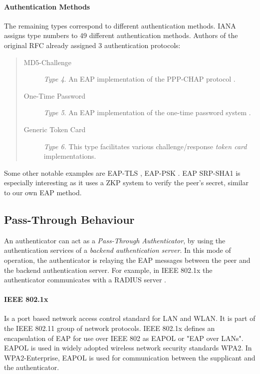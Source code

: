 \paragraph{Authentication Methods}
The remaining types correspond to different authentication methods.
IANA \cite{joseph2004eap} assigns type numbers to 49 different authentication methods.
Authors of the original RFC \cite{aboba2004extensible} already assigned 3 authentication protocols:

\begin{quote}
\begin{description}
	\item[MD5-Challenge] \textit{Type 4}. An EAP implementation of the PPP-CHAP protocol \cite{simon2008eap}.
	\item[One-Time Password] \textit{Type 5}. An EAP implementation of the one-time password system \cite{haller1998one}.
	\item[Generic Token Card] \textit{Type 6.} This type facilitates various challenge/response \textit{token card} implementations.
\end{description}
\end{quote}

Some other notable examples are EAP-TLS \cite{simon2008eap}, EAP-PSK \cite{bersani2007eap}.
EAP SRP-SHA1 \cite{ietf-pppext-eap-srp-03} is especially interesting as it uses a ZKP system to verify the peer's secret, similar to our own EAP method.

\subsection{Pass-Through Behaviour}
An authenticator can act as a \textit{Pass-Through Authenticator}, by using the authentication services of a \textit{backend authentication server}.
In this mode of operation, the authenticator is relaying the EAP messages between the peer and the backend authentication server.
For example, in IEEE 802.1x the authenticator communicates with a RADIUS server \cite{congdon2003ieee}.

\paragraph{IEEE 802.1x}

Is a port based network access control standard for LAN and WLAN.
It is part of the IEEE 802.11 group of network protocols.
IEEE 802.1x defines an encapsulation of EAP for use over IEEE 802 as EAPOL or "EAP over LANs".
EAPOL is used in widely adopted wireless network security standards WPA2. 
In WPA2-Enterprise, EAPOL is used for communication between the supplicant and the authenticator.

